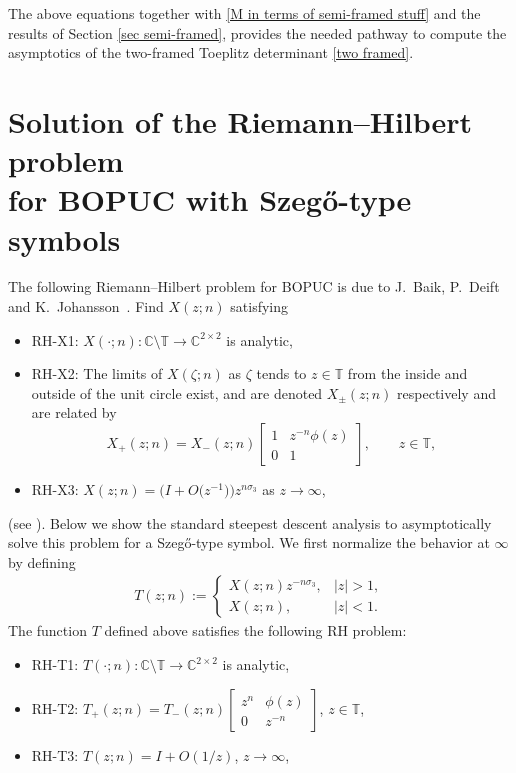 \documentclass[10pt,a4paper]{amsart}
\numberwithin{equation}{section}
\newcommand{\C}{{\mathbb C}}
\newcommand{\T}{{\mathbb T}}
\newcommand{\ze}{\zeta}
\begin{document}
		The above equations together with \eqref{M in terms of semi-framed stuff} and the results of Section \ref{sec semi-framed}, provides the needed pathway to compute the asymptotics of the two-framed Toeplitz determinant \eqref{two framed}.
		

\appendix
		
		
		\section[Solution of the Riemann--Hilbert problem for BOPUC\\ with Szeg\H{o}-type symbols]{Solution of the Riemann--Hilbert problem \\
for BOPUC with Szeg\H{o}-type symbols}\label{Appendices}
		
		
		
		The following Riemann--Hilbert problem for BOPUC is due to J.~Baik, P.~Deift and K.~Johansson~\cite{BDJ}. Find $X(z;n)$ satisfying
		\begin{itemize}\itemsep=0pt
			\item {\rm RH-X1:} $X(\cdot;n)\colon\C\setminus \T \to \C^{2\times2}$ is analytic,
			\item {\rm RH-X2:} The limits of $X(\ze;n)$ as $\ze$ tends to $z \in \T $ from the inside and outside of the unit circle exist, and are denoted $X_{\pm}(z;n)$ respectively and are related by
			\[
				X_+(z;n)=X_-(z;n)\begin{bmatrix}
					1 & z^{-n}\phi(z) \\
					0 & 1
				\end{bmatrix}, \qquad z \in \T,
			\]
			
			\item {\rm RH-X3:} $X(z;n)=\big( I + O\big(z^{-1}\big) \big) z^{n \sigma_3}$ as $z \to \infty$,
		\end{itemize}
		(see \cite{D, DIK}). Below we show the standard steepest descent analysis to asymptotically solve this problem for a Szeg\H{o}-type symbol. We first normalize the behavior at $\infty$ by defining \begin{gather*}%
			T(z;n) := \begin{cases}
				X(z;n)z^{-n\sigma_3}, & |z|>1, \\
				X(z;n), & |z|<1.
			\end{cases}
		\end{gather*}
		The function $T$ defined above satisfies the following RH problem:
				\begin{itemize}\itemsep=0pt
			\item {\rm RH-T1:} $T(\cdot;n) \colon\C\setminus \T \to \C^{2\times2}$ is analytic,
			\item {\rm RH-T2:} $T_{+}(z;n)=T_{-}(z;n)\begin{bmatrix}
				z^n & \phi(z) \\
				0 & z^{-n}
			\end{bmatrix}$, $z \in \T$,
			\item {\rm RH-T3:} $T(z;n)=I+O(1/z)$, $ z \to \infty$,
		\end{itemize}
\end{document}
